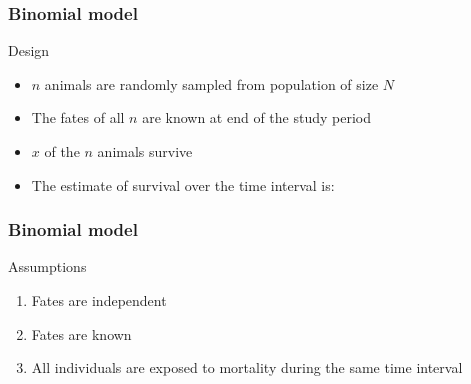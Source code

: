 \documentclass[color=usenames,dvipsnames]{beamer}\usepackage[]{graphicx}\usepackage[]{color}
\begin{document}
\begin{frame}
  \frametitle{Binomial model}
  \large
  {%
    Design}
  \begin{itemize}%
    \normalsize
    \item<1-> $n$ animals are randomly sampled from population of size $N$
    \item<2-> The fates of all $n$ are known at end of the study period
    \item<3-> $x$ of the $n$ animals survive
    \item<4-> The estimate of survival over the time interval is:
  \end{itemize}
  \pause
  \Large
  \vspace{0.5cm}
\end{frame}



\begin{frame}
  \frametitle{Binomial model}
  \large
  {%
    Assumptions}
  \begin{enumerate}[(1)]%
    \normalsize
    \item<1-> Fates are independent
    \item<1-> Fates are known
    \item<1-> All individuals are exposed to mortality during the same time interval
  \end{enumerate}
  \vspace{0.5cm}
  \vspace{0.5cm}
\end{frame}
\end{document}
